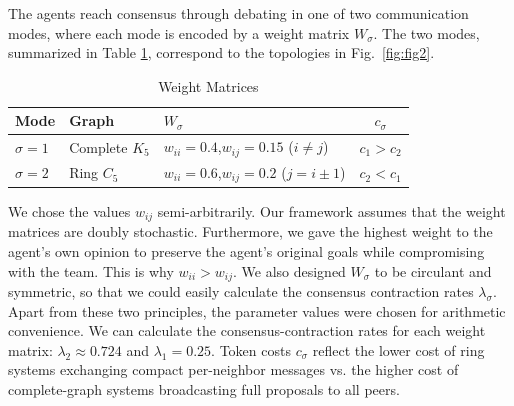 \documentclass[journal,twoside,web]{ieeecolor_no_firstpage_logo}
\begin{document}
The agents reach consensus through debating in one of two communication modes, where each mode is encoded by a weight matrix $W_\sigma$. The two modes, summarized in Table \ref{tab:weights}, correspond to the topologies in
Fig.~\ref{fig:fig2}. 
\begin{table}[h]
\centering
\caption{Weight Matrices}
\label{tab:weights}
\begin{tabular}{@{}lllc@{}}
\toprule
Mode & Graph & $W_\sigma$ & $c_\sigma$ \\
\midrule
$\sigma\!=\!1$ & Complete $K_5$ &
  $w_{ii}\!=\!0.4$,\;$w_{ij}\!=\!0.15$ ($i\!\ne\!j$) & $c_1 > c_2$ \\
$\sigma\!=\!2$ & Ring $C_5$ &
  $w_{ii}\!=\!0.6$,\;$w_{ij}\!=\!0.2$ ($j = i \pm 1$) & $c_2 < c_1$\\
\bottomrule
\end{tabular}
\end{table}
\noindent
We chose the values $w_{ij}$ semi-arbitrarily. Our framework assumes that the weight matrices are doubly stochastic. Furthermore, we gave the highest weight to the agent's own opinion to preserve the agent's original goals while compromising with the team. This is why $w_{ii} > w_{ij}$. We also designed $W_\sigma$ to be circulant and symmetric, so that we could easily calculate the consensus contraction rates $
\lambda_\sigma$. Apart from these two principles, the parameter values were chosen for arithmetic convenience. 
We can calculate the consensus-contraction rates for each weight matrix: 
$\lambda_2\approx0.724$ and $\lambda_1=0.25$.
Token costs $c_\sigma$ reflect the lower cost of ring systems exchanging compact per-neighbor
messages vs. the higher cost of complete-graph systems broadcasting full proposals to all peers.
\end{document}
